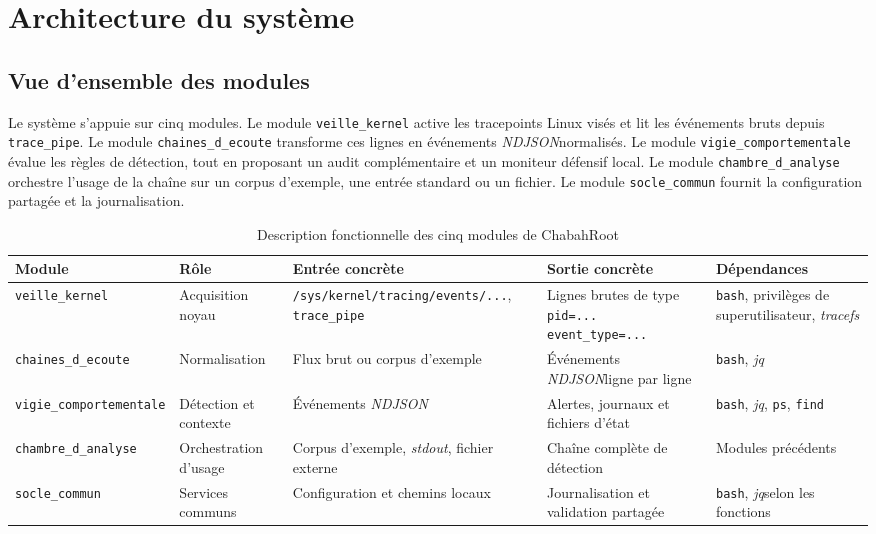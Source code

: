 \documentclass[12pt,a4paper]{report}
\newcommand{\tracefs}{\textit{tracefs}}
\newcommand{\ndjson}{\textit{NDJSON}}
\newcommand{\jq}{\textit{jq}}
\newcommand{\stdout}{\textit{stdout}}
\begin{document}
\chapter{Architecture du système}
\section{Vue d’ensemble des modules}
Le système s’appuie sur cinq modules. Le module \texttt{veille\_kernel} active les tracepoints Linux visés et lit les événements bruts depuis \texttt{trace\_pipe}. Le module \texttt{chaines\_d\_ecoute} transforme ces lignes en événements \ndjson normalisés. Le module \texttt{vigie\_comportementale} évalue les règles de détection, tout en proposant un audit complémentaire et un moniteur défensif local. Le module \texttt{chambre\_d\_analyse} orchestre l’usage de la chaîne sur un corpus d’exemple, une entrée standard ou un fichier. Le module \texttt{socle\_commun} fournit la configuration partagée et la journalisation.

\begin{table}[h]
\centering
\begin{tabular}{>{\raggedright\arraybackslash}p{2.8cm} >{\raggedright\arraybackslash}p{3.2cm} >{\raggedright\arraybackslash}p{3.3cm} >{\raggedright\arraybackslash}p{3.3cm} >{\raggedright\arraybackslash}p{2.6cm}}
\toprule
Module & Rôle & Entrée concrète & Sortie concrète & Dépendances \\
\midrule
\texttt{veille\_kernel} & Acquisition noyau & \texttt{/sys/kernel/tracing/events/...}, \texttt{trace\_pipe} & Lignes brutes de type \texttt{pid=... event\_type=...} & \texttt{bash}, privilèges de superutilisateur, \tracefs \\
\texttt{chaines\_d\_ecoute} & Normalisation & Flux brut ou corpus d’exemple & Événements \ndjson ligne par ligne & \texttt{bash}, \jq \\
\texttt{vigie\_comportementale} & Détection et contexte & Événements \ndjson & Alertes, journaux et fichiers d’état & \texttt{bash}, \jq, \texttt{ps}, \texttt{find} \\
\texttt{chambre\_d\_analyse} & Orchestration d’usage & Corpus d’exemple, \stdout, fichier externe & Chaîne complète de détection & Modules précédents \\
\texttt{socle\_commun} & Services communs & Configuration et chemins locaux & Journalisation et validation partagée & \texttt{bash}, \jq selon les fonctions \\
\bottomrule
\end{tabular}
\caption{Description fonctionnelle des cinq modules de ChabahRoot}
\end{table}
\end{document}
